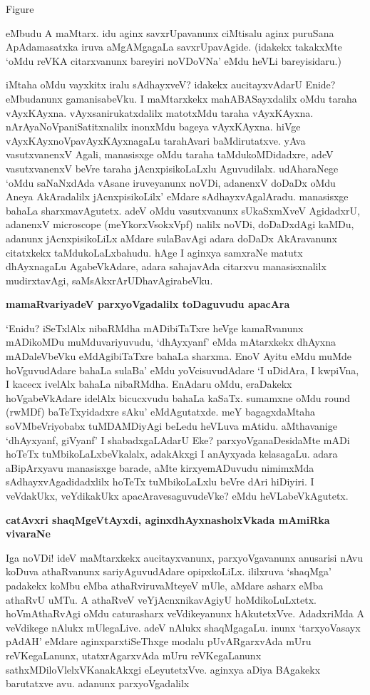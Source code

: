 \begin{center}
{\rm Figure}
\end{center}

eMbudu A maMtarx. idu aginx savxrUpavanunx ciMtisalu aginx puruSana ApAdamasatxka iruva aMgAMgagaLa savxrUpavAgide. (idakekx takakxMte `oMdu reVKA citarxvanunx bareyiri noVDoVNa' eMdu heVLi bareyisidaru.)

iMtaha oMdu vayxkitx iralu sAdhayxveV? idakekx aucitayxvAdarU Enide? eMbudanunx gamanisabeVku. I maMtarxkekx mahABASayxdalilx oMdu taraha vAyxKAyxna. vAyxsanirukatxdalilx matotxMdu taraha vAyxKAyxna. nArAyaNoVpaniSatitxnalilx inonxMdu bageya vAyxKAyxna. hiVge vAyxKAyxnoVpavAyxKAyxnagaLu tarahAvari baMdirutatxve. yAva vasutxvanenxV Agali, manasisxge oMdu taraha taMdukoMDidadxre, adeV vasutxvanenxV beVre taraha jAcnxpisikoLaLxlu Aguvudilalx. udAharaNege `oMdu saNaNxdAda vAsane iruveyanunx noVDi, adanenxV doDaDx oMdu Aneya AkAradalilx jAcnxpisikoLilx' eMdare sAdhayxvAgalAradu. manasisxge bahaLa sharxmavAgutetx. adeV  oMdu vasutxvanunx sUkaSxmXveV AgidadxrU, adanenxV {\rm microscope} (meYkorxVsokxVpf) nalilx noVDi, doDaDxdAgi kaMDu, adanunx jAcnxpisikoLiLx aMdare sulaBavAgi adara doDaDx AkAravanunx citatxkekx taMdukoLaLxbahudu. hAge I aginxya samxraNe matutx dhAyxnagaLu AgabeVkAdare, adara sahajavAda citarxvu manasisxnalilx mudirxtavAgi, saMsAkxrArUDhavAgirabeVku.

{\bf mamaRvariyadeV parxyoVgadalilx toDaguvudu apacAra}

`Enidu? iSeTxlAlx nibaRMdha mADibiTaTxre heVge kamaRvanunx mADikoMDu muMduvariyuvudu, `dhAyxyanf' eMda mAtarxkekx dhAyxna mADaleVbeVku eMdAgibiTaTxre bahaLa sharxma. EnoV Ayitu eMdu muMde hoVguvudAdare bahaLa sulaBa' eMdu yoVcisuvudAdare `I uDidAra, I kwpiVna, I kacecx ivelAlx bahaLa nibaRMdha. EnAdaru oMdu, eraDakekx hoVgabeVkAdare idelAlx bicucxvudu bahaLa kaSaTx. sumamxne oMdu {\rm round} (rwMDf) baTeTxyidadxre sAku' eMdAgutatxde. meY bagagxdaMtaha soVMbeVriyobabx tuMDAMDiyAgi beLedu heVLuva mAtidu. aMthavanige `dhAyxyanf, giVyanf' I shabadxgaLAdarU Eke? parxyoVganaDesidaMte mADi hoTeTx tuMbikoLaLxbeVkalalx, adakAkxgi I anAyxyada kelasagaLu. adara aBipArxyavu manasisxge barade, aMte kirxyemADuvudu nimimxMda sAdhayxvAgadidadxlilx hoTeTx tuMbikoLaLxlu beVre dAri hiDiyiri. I veVdakUkx, veYdikakUkx apacAravesaguvudeVke? eMdu heVLabeVkAgutetx.

{\bf catAvxri shaqMgeVtAyxdi, aginxdhAyxnasholxVkada mAmiRka vivaraNe}

Iga noVDi! ideV maMtarxkekx aucitayxvanunx, parxyoVgavanunx anusarisi nAvu koDuva athaRvanunx sariyAguvudAdare opipxkoLiLx. ililxruva `shaqMga' padakekx koMbu eMba athaRviruvaMteyeV mUle, aMdare asharx eMba athaRvU uMTu. A athaRveV veYjAcnxnikavAgiyU hoMdikoLuLxtetx. hoVmAthaRvAgi oMdu caturasharx veVdikeyanunx hAkutetxVve. AdadxriMda A veVdikege nAlukx mUlegaLive. adeV nAlukx shaqMgagaLu. inunx `tarxyoVasayx pAdAH' eMdare aginxparxtiSeThxge modalu pUvARgarxvAda mUru reVKegaLanunx, utatxrAgarxvAda mUru reVKegaLanunx sathxMDiloVlelxVKanakAkxgi eLeyutetxVve. aginxya aDiya BAgakekx barutatxve avu. adanunx parxyoVgadalilx

